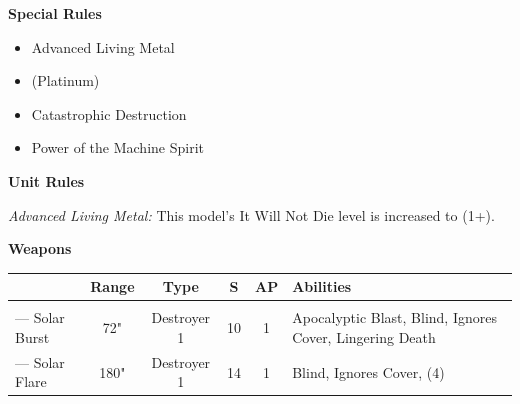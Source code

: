 \begin{minipage}[t]{0.72\textwidth}
\begin{minipage}[t]{0.5\textwidth}
\begin{flushleft}
			\textbf{Special Rules}
			\begin{itemize}
				\item Advanced Living Metal
				\item {} (Platinum)
				\item Catastrophic Destruction
				\item Power of the Machine Spirit
			\end{itemize}
		\end{flushleft}
	\end{minipage}
	
	\vspace*{2em}
	\textbf{Unit Rules}
	
	\textit{Advanced Living Metal:} This model's It Will Not Die level is increased to (1+).
	
	\vspace*{2em}
	\textbf{Weapons}
	
	\begin{tabular}{m{95 pt} *{4}{c} >{\raggedright\arraybackslash}p{130pt}}
		& Range & Type & S & AP & Abilities \\
		\hline
		\quickref{Star Cage} & & & & & \\
		— Solar Burst & 72" & Destroyer 1 & 10 & 1 & Apocalyptic Blast, Blind, Ignores Cover, Lingering Death \\
		— Solar Flare & 180" & Destroyer 1 & 14 & 1 & Blind, Ignores Cover, \quickref{Path of Annihilation} (4)\\
	\end{tabular}
\end{minipage}



\newpage
